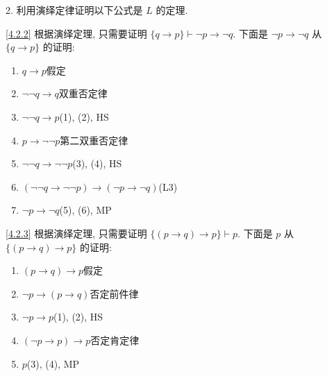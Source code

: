 \documentclass[boxes]{homework}
\begin{document}
\begin{problem}
2. 利用演绎定律证明以下公式是 $L$ 的定理.
\end{problem}
\begin{solution}
    \ref{4.2.2}
    根据演绎定理, 只需要证明 $\{q\to p\}\vdash \lnot p\to \lnot q$. 下面是 $\lnot p\to \lnot q$ 从 $\{q\to p\}$ 的证明:
    \begin{enumerate}[label = (\arabic*), itemsep = 0em, topsep = .5em, partopsep = .5em]
        \item $q\to p$\hfill 假定
        \item $\lnot \lnot q\to q$\hfill 双重否定律
        \item $\lnot \lnot q\to p$\hfill (1), (2), HS
        \item $p\to \lnot \lnot p$\hfill 第二双重否定律
        \item $\lnot \lnot q\to \lnot \lnot p$\hfill (3), (4), HS
        \item $(\lnot \lnot q\to \lnot \lnot p)\to(\lnot p\to \lnot q)$\hfill (L3)
        \item $\lnot p\to \lnot q$\hfill (5), (6), MP
    \end{enumerate}
    \ref{4.2.3}
    根据演绎定理, 只需要证明 $\{(p\to q)\to p\}\vdash p$.
    下面是 $p$ 从 $\{(p\to q)\to p\}$ 的证明:
    \begin{enumerate}[label = (\arabic*), itemsep = 0em, topsep = .5em, partopsep = .5em]
        \item $(p\to q)\to p$\hfill 假定
        \item $\lnot p\to (p\to q)$\hfill 否定前件律
        \item $\lnot p\to p$\hfill (1), (2), HS
        \item $(\lnot p\to p)\to p$\hfill 否定肯定律
        \item $p$\hfill (3), (4), MP
    \end{enumerate}
\end{solution}
\end{document}
